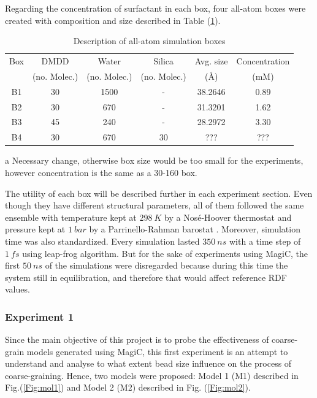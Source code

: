 \documentclass[10pt,a4paper,twoside]{article}
\begin{document}
Regarding the concentration of surfactant in each box, four all-atom boxes were created with composition and size described in Table (\ref{tab:boxes}). 
\begin{table}[ht!] 
  \centering
\begin{threeparttable}

  \caption{Description of all-atom simulation boxes}

    \begin{tabular}{cccccc}
    \toprule
    Box &  DMDD &  Water & Silica & Avg. size & Concentration \\
	& (no. Molec.) & (no. Molec.) & (no. Molec.)  & (\AA) & (mM)\\
    \midrule
    B1   & 30  & 1500  & -  & 38.2646 & 0.89\\
    B2   & 30  & 670  & -   &  31.3201 & 1.62\\
    B3   & 45\tnote{a}  & 240  & -  & 28.2972 & 3.30\\
    B4   & 30  & 670  &  30  & ??? & ???\\
    \bottomrule
    \end{tabular}%
    \begin{tablenotes}
    	\item[a] Necessary change, otherwise box size would be too small for the experiments, however concentration is the same as a 30-160 box.
    \end{tablenotes}
  \label{tab:boxes}%
\end{threeparttable} 
\end{table}

The utility of each box will be described further in each experiment section. Even though they have different structural parameters, all of them followed the same ensemble with temperature kept at $298\ K$ by a Nosé-Hoover thermostat \cite{nosetstat} and pressure kept at $1\ bar$ by a Parrinello-Rahman barostat \cite{prbstat}. Moreover, simulation time was also standardized. Every simulation lasted $350\ ns$ with a time step of $1\ fs$ using leap-frog algorithm. But for the sake of experiments using MagiC, the first $50\ ns$ of the simulations were disregarded because during this time the system still in equilibration, and therefore that would affect reference RDF values.


\subsubsection*{Experiment 1}
 Since the main objective of this project is to probe the effectiveness of coarse-grain models generated using MagiC, this first experiment is an attempt to understand and analyse to what extent bead size influence on the process of coarse-graining. Hence, two models were proposed: Model 1 (M1) described in Fig.(\ref{Fig:mol1}) and Model 2 (M2) described in Fig. (\ref{Fig:mol2}).
 
\end{document}

